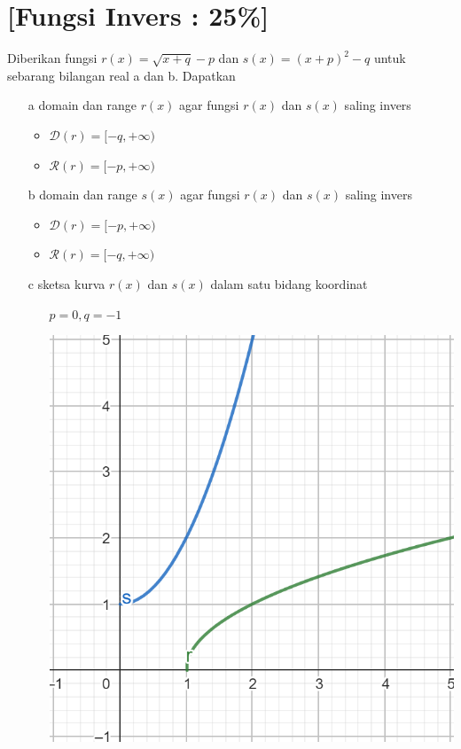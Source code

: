 \documentclass[12pt, a4paper]{article}
\begin{document}
    \section{[{\bf Fungsi Invers} : 25\%]} 
    
    Diberikan fungsi $r(x) =  \sqrt{x + q} - p$ dan $s(x) = (x + p)^2 - q$ untuk sebarang bilangan real a dan b. Dapatkan 
    \begin{enumerate}
        \item[a] domain dan range  $r(x)$ agar fungsi $r(x)$ dan $s(x)$ saling invers
        \begin{itemize}
            \item $\mathcal{D}(r) = [-q,+\infty)$ 
            \item $\mathcal{R}(r) = [-p,+\infty)$ 
        \end{itemize}
        \item[b] domain dan range  $s(x)$ agar fungsi $r(x)$ dan $s(x)$ saling invers 
        \begin{itemize}
            \item $\mathcal{D}(r) = [-p,+\infty)$ 
            \item $\mathcal{R}(r) = [-q,+\infty)$ 
        \end{itemize}
        \item[c] sketsa kurva $r(x)$ dan $s(x)$ dalam satu bidang koordinat
        \begin{enumerate}
            \item[] $p = 0,q= -1$
            \item[] \includegraphics[scale=0.3]{7c.png}
        \end{enumerate}
    \end{enumerate} 
\end{document}
